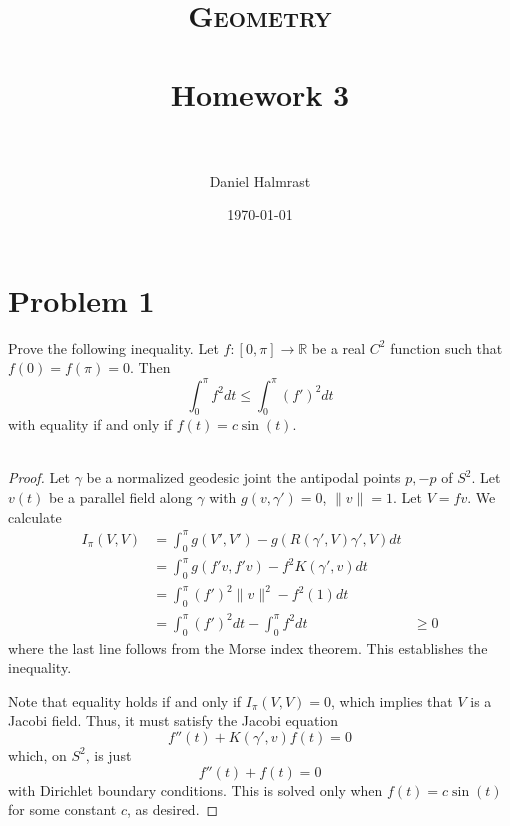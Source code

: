 \documentclass[fontsize=11pt]{scrartcl} %
\title{	
\normalfont \normalsize 
\textsc{Geometry} \\ [25pt] %
\horrule{0.5pt} \\[0.4cm] %
\huge Homework 3 \\ %
\horrule{2pt} \\[0.5cm] %
}
\author{Daniel Halmrast} %
\date{\normalsize\today} %
\numberwithin{equation}{section} %
\numberwithin{figure}{section} %
\numberwithin{table}{section} %
\newcommand{\R}{\mathbb{R}}
\begin{document}
\maketitle %

\section*{Problem 1}
Prove the following inequality. Let $f:[0,\pi]\to\R$ be a real $C^2$ function
such that $f(0)=f(\pi)=0$. Then
\[
    \int_0^{\pi}f^2dt \leq\int_{0}^{\pi}(f')^2dt
\]
with equality if and only if $f(t) = c\sin(t)$.
\\
\\
\begin{proof}
    Let $\gamma$ be a normalized geodesic joint the antipodal points $p,-p$ of
    $S^2$. Let $v(t)$ be a parallel field along $\gamma$ with $g(v,\gamma')=0$,
    $\|v\|=1$. Let $V = fv$. We calculate
    \[
        \begin{aligned}
            I_{\pi}(V,V) &= \int_{0}^{\pi}g(V',V')
            -g(R(\gamma',V)\gamma',V)dt\\
            &= \int_0^{\pi}g(f'v,f'v) - f^2K(\gamma',v)dt\\
            &=\int_0^{\pi}(f')^2\|v\|^2 - f^2(1)dt\\
            &=\int_0^{\pi}(f')^2dt - \int_0^{\pi}f^2dt
            &\geq 0
        \end{aligned}
    \]
    where the last line follows from the Morse index theorem. This establishes
    the inequality.

    Note that equality holds if and only if $I_{\pi}(V,V)=0$, which implies that
    $V$ is a Jacobi field. Thus, it must satisfy the Jacobi equation
    \[
        f''(t) + K(\gamma',v)f(t) = 0
    \]
    which, on $S^2$, is just
    \[
        f''(t) + f(t) = 0
    \]
    with Dirichlet boundary conditions. This is solved only when $f(t) =
    c\sin(t)$ for some constant $c$, as desired.
\end{proof}

\newpage
\end{document}
